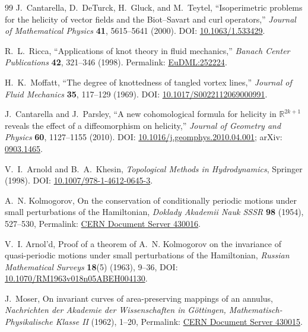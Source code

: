 \begin{thebibliography}{99}
J.~Cantarella, D.~DeTurck, H.~Gluck, and M.~Teytel,
``Isoperimetric problems for the helicity of vector fields and the Biot--Savart and curl operators,''
\emph{Journal of Mathematical Physics} \textbf{41}, 5615--5641 (2000).
DOI: \href{https://doi.org/10.1063/1.533429}{10.1063/1.533429}.


R.~L.~Ricca,
``Applications of knot theory in fluid mechanics,''
\emph{Banach Center Publications} \textbf{42}, 321--346 (1998).
Permalink: \href{https://eudml.org/doc/252224}{EuDML:252224}.

H.~K.~Moffatt,
``The degree of knottedness of tangled vortex lines,''
\emph{Journal of Fluid Mechanics} \textbf{35}, 117--129 (1969).
DOI: \href{https://doi.org/10.1017/S0022112069000991}{10.1017/S0022112069000991}.

J.~Cantarella and J.~Parsley,
``A new cohomological formula for helicity in $\mathbb R^{2k+1}$ reveals the effect of a diffeomorphism on helicity,''
\emph{Journal of Geometry and Physics} \textbf{60}, 1127--1155 (2010).
DOI: \href{https://doi.org/10.1016/j.geomphys.2010.04.001}{10.1016/j.geomphys.2010.04.001};
arXiv: \href{https://arxiv.org/abs/0903.1465}{0903.1465}.

V.~I.~Arnold and B.~A.~Khesin,
\emph{Topological Methods in Hydrodynamics},
Springer (1998).
DOI: \href{https://doi.org/10.1007/978-1-4612-0645-3}{10.1007/978-1-4612-0645-3}.


A.~N. Kolmogorov,
\newblock On the conservation of conditionally periodic motions under small perturbations of the Hamiltonian,
\newblock \emph{Doklady Akademii Nauk SSSR} \textbf{98} (1954), 527--530,
\newblock Permalink: \href{https://cds.cern.ch/record/430016}{CERN Document Server 430016}.

V.~I. Arnol'd,
\newblock Proof of a theorem of A.~N. Kolmogorov on the invariance of quasi-periodic motions under small perturbations of the Hamiltonian,
\newblock \emph{Russian Mathematical Surveys} \textbf{18}(5) (1963), 9--36,
\newblock DOI: \href{https://doi.org/10.1070/RM1963v018n05ABEH004130}{10.1070/RM1963v018n05ABEH004130}.

J.~Moser,
\newblock On invariant curves of area-preserving mappings of an annulus,
\newblock \emph{Nachrichten der Akademie der Wissenschaften in G\"ottingen, Mathematisch-Physikalische Klasse II} (1962), 1--20,
\newblock Permalink: \href{https://cds.cern.ch/record/430015}{CERN Document Server 430015}.


\end{thebibliography}

